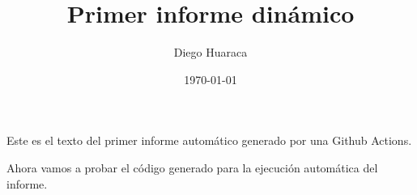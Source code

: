 \documentclass[12pt, a4paper]{book}
\title{Primer informe dinámico}
\author{Diego Huaraca}
\date{\today}
\begin{document}
\maketitle

Este es el texto del primer informe automático generado por una Github Actions.\newline

Ahora vamos a probar el código generado para la ejecución automática del informe.
\end{document}
